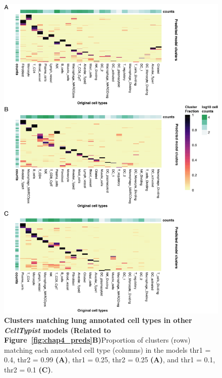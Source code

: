 \begin{figure}[ht!] 
\centering
\includegraphics[scale=0.85]{Appendix2/Figs/appB_otherClustFrac_lung.png} %
\caption[Clusters matching lung annotated cell types in other \textit{CellTypist} models]{\textbf{Clusters matching lung annotated cell types in other \textit{CellTypist} models (Related to Figure~\ref{fig:chap4_preds}B)}\newline Proportion of clusters (rows) matching each annotated cell type (columns) in the models thr1 = 0.4, thr2 = 0.99 \textbf{(A)}, thr1 = 0.25, thr2 = 0.25 \textbf{(A)}, and thr1 = 0.1, thr2 = 0.1 \textbf{(C)}.}
\label{fig:appB_othercl}
\end{figure}


